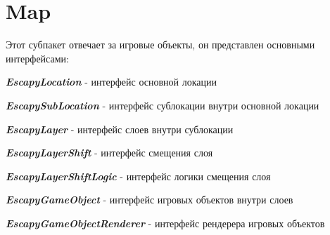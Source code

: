\documentclass[11pt]{report}
\newenvironment{itemize*}%
  {\begin{itemize}%
    \setlength{\itemsep}{2pt}%
    \setlength{\parskip}{0.75pt}}%
  {\end{itemize}}
\begin{document}
\section{Map}
Этот субпакет отвечает за игровые объекты, он представлен основными интерфейсами:
\begin{itemize*} 
	\item \textit{\textbf{EscapyLocation}} - интерфейс основной локации
	\item \textit{\textbf{EscapySubLocation}} - интерфейс сублокации внутри основной 			локации
	\item \textit{\textbf{EscapyLayer}} - интерфейс слоев внутри сублокации
	\item \textit{\textbf{EscapyLayerShift}} - интерфейс смещения слоя
	\item \textit{\textbf{EscapyLayerShiftLogic}} - интерфейс логики смещения слоя
	\item \textit{\textbf{EscapyGameObject}} - интерфейс игровых объектов внутри слоев
	\item \textit{\textbf{EscapyGameObjectRenderer}} - интерфейс рендерера игровых 				объектов

\end{itemize*}
\end{document}
